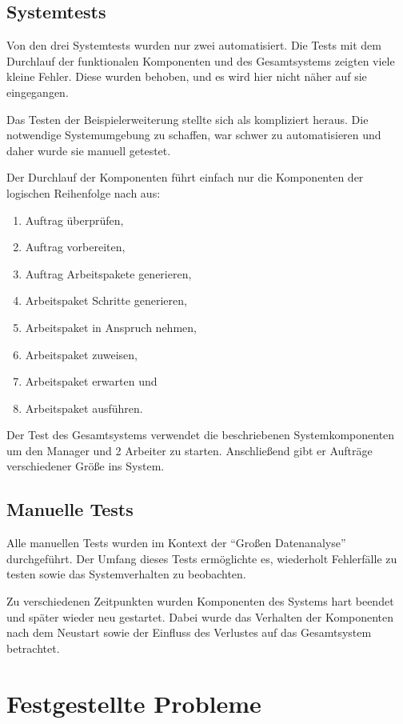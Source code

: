 \subsection{Systemtests}

Von den drei Systemtests wurden nur zwei automatisiert.
Die Tests mit dem Durchlauf der funktionalen Komponenten und des Gesamtsystems
zeigten viele kleine Fehler. Diese wurden behoben, und es wird hier nicht näher auf sie eingegangen.

Das Testen der Beispielerweiterung stellte sich als kompliziert heraus.
Die notwendige Systemumgebung zu schaffen, war schwer zu automatisieren und daher wurde sie manuell getestet.

Der Durchlauf der Komponenten führt einfach nur die Komponenten der logischen Reihenfolge nach aus:
\begin{enumerate}
    \item Auftrag überprüfen,
    \item Auftrag vorbereiten,
    \item Auftrag Arbeitspakete generieren,
    \item Arbeitspaket Schritte generieren,
    \item Arbeitspaket in Anspruch nehmen,
    \item Arbeitspaket zuweisen,
    \item Arbeitspaket erwarten und
    \item Arbeitspaket ausführen.
\end{enumerate}

Der Test des Gesamtsystems verwendet die beschriebenen Systemkomponenten um den Manager und 2 Arbeiter zu starten.
Anschließend gibt er Aufträge verschiedener Größe ins System.

\subsection{Manuelle Tests}

Alle manuellen Tests wurden im Kontext der ``Großen Datenanalyse'' durchgeführt.
Der Umfang dieses Tests ermöglichte es, wiederholt Fehlerfälle zu testen sowie das Systemverhalten zu beobachten.

Zu verschiedenen Zeitpunkten wurden Komponenten des Systems hart beendet und später wieder neu gestartet.
Dabei wurde das Verhalten der Komponenten nach dem Neustart
 sowie der Einfluss des Verlustes auf das Gesamtsystem betrachtet.


\section{Festgestellte Probleme}
\label{sec:eval:probleme}

